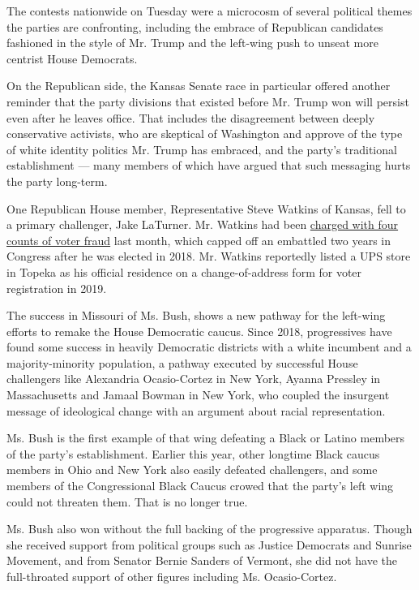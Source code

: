 The contests nationwide on Tuesday were a microcosm of several political
themes the parties are confronting, including the embrace of Republican
candidates fashioned in the style of Mr. Trump and the left-wing push to
unseat more centrist House Democrats.

On the Republican side, the Kansas Senate race in particular offered
another reminder that the party divisions that existed before Mr. Trump
won will persist even after he leaves office. That includes the
disagreement between deeply conservative activists, who are skeptical of
Washington and approve of the type of white identity politics Mr. Trump
has embraced, and the party's traditional establishment --- many members
of which have argued that such messaging hurts the party long-term.

One Republican House member, Representative Steve Watkins of Kansas,
fell to a primary challenger, Jake LaTurner. Mr. Watkins had been
\href{https://www.nytimes.com/2020/07/14/us/steve-watkins-voter-fraud-kansas.html}{charged
with four counts of voter fraud} last month, which capped off an
embattled two years in Congress after he was elected in 2018. Mr.
Watkins reportedly listed a UPS store in Topeka as his official
residence on a change-of-address form for voter registration in 2019.

The success in Missouri of Ms. Bush, shows a new pathway for the
left-wing efforts to remake the House Democratic caucus. Since 2018,
progressives have found some success in heavily Democratic districts
with a white incumbent and a majority-minority population, a pathway
executed by successful House challengers like Alexandria Ocasio-Cortez
in New York, Ayanna Pressley in Massachusetts and Jamaal Bowman in New
York, who coupled the insurgent message of ideological change with an
argument about racial representation.

Ms. Bush is the first example of that wing defeating a Black or Latino
members of the party's establishment. Earlier this year, other longtime
Black caucus members in Ohio and New York also easily defeated
challengers, and some members of the Congressional Black Caucus crowed
that the party's left wing could not threaten them. That is no longer
true.

Ms. Bush also won without the full backing of the progressive apparatus.
Though she received support from political groups such as Justice
Democrats and Sunrise Movement, and from Senator Bernie Sanders of
Vermont, she did not have the full-throated support of other figures
including Ms. Ocasio-Cortez.

